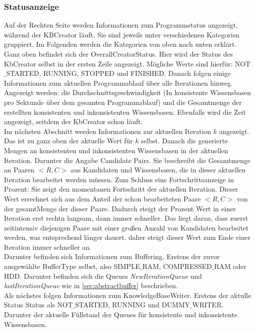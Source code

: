 \documentclass[12pt,a4paper]{article}
\begin{document}
\subsubsection{Statusanzeige}
Auf der Rechten Seite werden Informationen zum Programmstatus angezeigt, während der KBCreator läuft. Sie sind jeweils unter verschiedenen Kategorien gruppiert. Im Folgenden werden die Kategorien von oben nach unten erklärt. \\
Ganz oben befindet sich der OverallCreatorStatus. Hier wird der Status des KbCreator selbst in der ersten Zeile angezeigt. Mögliche Werte sind hierfür: NOT$\_$STARTED, RUNNING, STOPPED und FINISHED. Danach folgen einige Informationen zum aktuellen Programmablauf über alle Iterationen hinweg. Angezeigt werden: die Durchschnittsgeschwindigkeit (In konsistente Wissensbasen pro Sektunde über dem gesamten Programmablauf) und die Gesamtmenge der erstellten konsistenten und inkonsistenten Wissensbasen. Ebenfalls wird die Zeit angezeigt, seitdem der KbCreator schon läuft. \\
Im nächsten Abschnitt werden Informationen zur aktuellen Iteration $k$ angezeigt. Das ist zu ganz oben der aktuelle Wert für $k$ selbst. Danach die generierte Mengen an konsistenten und inkonsistenten Wissensbasen in der aktuellen Iteration. Darunter die Angabe \glqq Candidate Pairs\grqq \space. Sie beschreibt die Gesamtmenge an Paaren $<R, C>$ aus Kandidaten und Wissensbasen, die in dieser aktuellen Iteration bearbeitet werden müssen. Zum Schluss eine Fortschrittsanzeige in Prozent: Sie zeigt den momentanen Fortschritt der aktuellen Iteration. Dieser Wert errechnet sich aus dem Anteil der schon bearbeiteten Paare $<R,C>$ von der gesamtMenge der dieser Paare. Dadurch steigt der Prozent Wert in einer Iteration erst rechtn langsam, dann immer schneller. Das liegt daran, dass zuerst zeitintensiv diejenigen Paare mit einer großen Anzahl von Kandidaten bearbeitet werden, was entsprechend länger dauert. daher steigt dieser Wert zum Ende einer Iteration immer schneller an. \\
Darunter befinden sich Informationen zum Buffering. Erstens der zuvor ausgewählte BufferType selbst, also SIMPLE$\_$RAM, COMPRESSED$\_$RAM oder HDD. Darunter befinden sich die Queues \textit{NewIterationQueue} und \textit{lastIterationQueue} wie in \autoref{sec:abstractbuffer} beschrieben. \\
Als nächstes folgen Informationen zum KnowledgeBaseWriter. Erstens der aktulle Status Status als NOT$\_$STARTED, RUNNING und DUMMY$\_$WRITER. Darunter der aktuelle Füllstand der Queues für konsistente und inkonsistente Wissensbasen. \\
\end{document}
